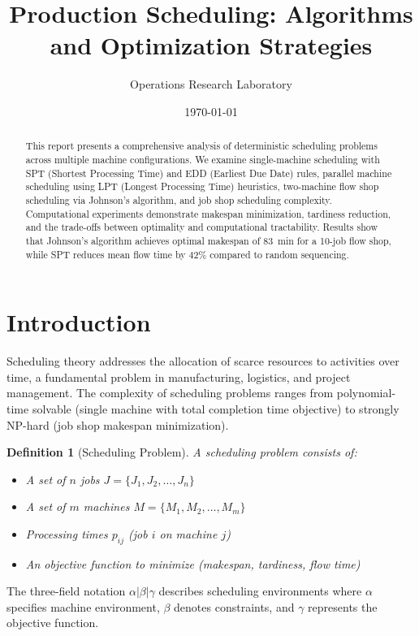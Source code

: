 \documentclass[a4paper, 11pt]{article}
\title{Production Scheduling: Algorithms and Optimization Strategies}
\author{Operations Research Laboratory}
\date{\today}
\newtheorem{definition}{Definition}[section]
\begin{document}
\maketitle

\begin{abstract}
This report presents a comprehensive analysis of deterministic scheduling problems across
multiple machine configurations. We examine single-machine scheduling with SPT (Shortest
Processing Time) and EDD (Earliest Due Date) rules, parallel machine scheduling using LPT
(Longest Processing Time) heuristics, two-machine flow shop scheduling via Johnson's algorithm,
and job shop scheduling complexity. Computational experiments demonstrate makespan minimization,
tardiness reduction, and the trade-offs between optimality and computational tractability.
Results show that Johnson's algorithm achieves optimal makespan of \SI{83}{min} for a 10-job
flow shop, while SPT reduces mean flow time by 42\% compared to random sequencing.
\end{abstract}

\section{Introduction}

Scheduling theory addresses the allocation of scarce resources to activities over time, a
fundamental problem in manufacturing, logistics, and project management. The complexity of
scheduling problems ranges from polynomial-time solvable (single machine with total completion
time objective) to strongly NP-hard (job shop makespan minimization).

\begin{definition}[Scheduling Problem]
A scheduling problem consists of:
\begin{itemize}
\item A set of $n$ jobs $J = \{J_1, J_2, \ldots, J_n\}$
\item A set of $m$ machines $M = \{M_1, M_2, \ldots, M_m\}$
\item Processing times $p_{ij}$ (job $i$ on machine $j$)
\item An objective function to minimize (makespan, tardiness, flow time)
\end{itemize}
\end{definition}

The three-field notation $\alpha|\beta|\gamma$ describes scheduling environments where $\alpha$
specifies machine environment, $\beta$ denotes constraints, and $\gamma$ represents the objective
function.
\end{document}
